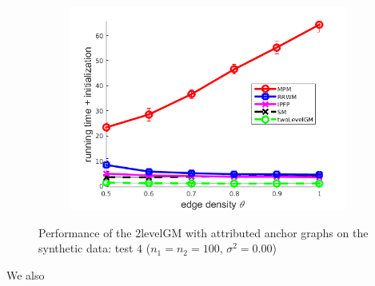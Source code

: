 \begin{figure}[h]
\begin{subfigure}[b]{0.3\textwidth}
			\includegraphics[scale=0.25]{"chapter3/fig/SyntheticTest/descr/Results_v4.3.3/Test4/time_summary_avg10t"} 
		\end{subfigure} 	
	\caption[Performance of the 2levelGM with attributed anchor graphs on the synthetic data (test $4$)]{Performance of the 2levelGM with attributed anchor graphs on the synthetic data: test $4$ ($n_1=n_2=100$, $\sigma^2=0.00$)}
	\label{fig:synTest4_descr_ver433}
\end{figure}
\FloatBarrier
We also

